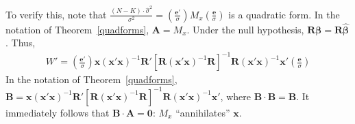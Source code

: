 \noindent To verify this, note that $\frac{ (N-K) \cdot \hat{\sigma}^2 } {\sigma^2} = \left( \frac{\bm{e}'}{\sigma} \right) M_x \left( \frac{\bm{e}}{\sigma} \right)$ is a quadratic form. In the notation of Theorem~\ref{quadforms}, $\bm{A} = M_x$. Under the null hypothesis, $\bm{R \beta}= \bm{R \hat{\beta}}$. Thus, 
\begin{align}
W' = \left( \frac{\bm{e}'}{\sigma} \right) \bm{x} { \left( \bm{x}' \bm{x} \right) }^{-1} \bm{R}' {\left[ \bm{R} { \left( \bm{x}' \bm{x} \right) }^{-1} \bm{R} \right]}^{-1} \bm{R} { \left( \bm{x}' \bm{x} \right) }^{-1} \bm{x}' \left( \frac{\bm{e}}{\sigma} \right)	
\end{align}
\noindent In the notation of Theorem~\ref{quadforms}, $\bm{B} = \bm{x} { \left( \bm{x}' \bm{x} \right) }^{-1} \bm{R}' {\left[ \bm{R} { \left( \bm{x}' \bm{x} \right) }^{-1} \bm{R} \right]}^{-1} \bm{R} { \left( \bm{x}' \bm{x} \right) }^{-1} \bm{x}'$, where $\bm{B} \cdot \bm{B} = \bm{B}$. It immediately follows that $\bm{B} \cdot \bm{A} = \bm{0}$: $M_x$ ``annihilates'' $\bm{x}$.   









